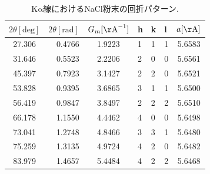 \documentclass[11pt,a4j,uplatex]{jsarticle}
\begin{document}
\begin{table}[htbp]
 \begin{center}
  \caption{$\mathrm{K\alpha}$線におけるNaCl粉末の回折パターン.}
  \begin{tabular}{|c|r|c|lll|c|}  \hline
   $2\theta[\mathrm{deg}]$ & \multicolumn{1}{c|}{$2\theta[\mathrm{rad}]$} & $G_{m}[\mathrm{\AA}^{-1}]$ & h & k & l & $a[\mathrm{\AA}]$ \\ \hline  \hline
   27.306                  & 0.4766                                       & 1.9223                     & 1 & 1 & 1 & 5.6583            \\
   31.646                  & 0.5523                                       & 2.2206                     & 2 & 0 & 0 & 5.6561            \\
   45.397                  & 0.7923                                       & 3.1427                     & 2 & 2 & 0 & 5.6521            \\
   53.828                  & 0.9395                                       & 3.6865                     & 3 & 1 & 1 & 5.6500            \\
   56.419                  & 0.9847                                       & 3.8497                     & 2 & 2 & 2 & 5.6510            \\
   66.178                  & 1.1550                                       & 4.4462                     & 4 & 0 & 0 & 5.6498            \\
   73.041                  & 1.2748                                       & 4.8466                     & 3 & 3 & 1 & 5.6480            \\
   75.259                  & 1.3135                                       & 4.9724                     & 4 & 2 & 0 & 5.6482            \\
   83.979                  & 1.4657                                       & 5.4484                     & 4 & 2 & 2 & 5.6468            \\\hline
  \end{tabular}
  \label{powa}
 \end{center}
\end{table}
\end{document}
